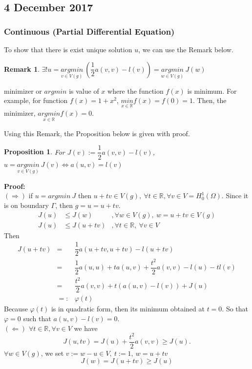 \documentclass[a4paper,10pt]{article}
\newtheorem{remark}{Remark}[]
\newtheorem{prop}{Proposition}
\begin{document}

\subsection{4 December 2017}

\subsubsection{Continuous (Partial Differential Equation)}
To show that there is exist unique solution $ u $, we can use the Remark below. 
\begin{remark}
	$ \exists ! u = \underset{v \in V(g)}{argmin} \ (\dfrac{1}{2} a(v,v)-l(v)) = \underset{w \in V(g)}{argmin} \ J(w)$
\end{remark}

minimizer or $ argmin $ is value of $ x $ where the function $ f(x) $ is minimum. For example, for function $ f(x)=1+x^2 $, $ \underset{x \in \mathbb{R}}{min} f(x) = f(0) =1 $. Then, the minimizer, $ \underset{x \in \mathbb{R}}{argmin} f(x) = 0 $.

Using this Remark, the Proposition below is given with proof.
\begin{prop}
	For $ J(v) := \dfrac{1}{2} a(v,v) -l (v) $,
	$ u = \underset{v \in V(g)}{argmin} \ J(v) \iff a(u,v)=l(v) $
\end{prop}

\textbf{Proof:}\\
$ (\Rightarrow) $ if $ u = argmin \ J $ then $ u+tv \in V(g) , \ \forall t \in \mathbb{R}, \forall v \in V = H_{0}^{1} (\Omega) $. Since it is on boundary $ \Gamma $, then $ g=u=u+tv $.
\begin{eqnarray}\nonumber
J(u) &\leq J(w) &, \forall w \in V(g), \ w=u+tv \in V(g)\\ \nonumber
J(u) &\leq J(u+tv) &, \forall t \in \mathbb{R}, \ \forall v \in V
\end{eqnarray}
Then
\begin{eqnarray}\nonumber
J(u+tv) &=& \dfrac{1}{2} a(u+tv,u+tv)-l(u+tv)\\ \nonumber
&=& \dfrac{1}{2} a(u,u) + t a(u,v) + \dfrac{t^2}{2} a (v,v) - l(u) - t l(v)\\ \nonumber
&=& \dfrac{t^2}{2} a (v,v) + t (a(u,v) - l(v)) + J(u)\\ \nonumber
&=:& \varphi(t)
\end{eqnarray}
Because $ \varphi(t) $ is in quadratic form, then its minimum obtained at $ t=0 $. So that $ \varphi =0 $ such that $ a(u,v) - l(v) =0 $.\\
$ (\Leftarrow) $ $ \forall t \in \mathbb{R}, \forall v \in V $ we have
\begin{equation}\nonumber
J(u,tv) = J(u) + \dfrac{t^2}{2} a(v,v) \geq J(u).
\end{equation}
$ \forall w \in V(g) $, we set $ v := w -u \in V , \ t:=1 , \ w=u+tv $
\begin{equation}\nonumber
J(w) = J(u+tv) \geq J(u)
\end{equation}
\end{document}
